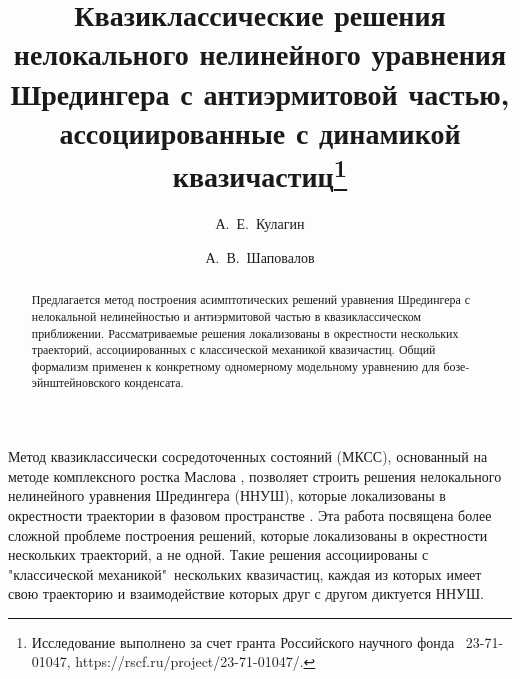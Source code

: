 \usepackage{todonotes}

\usepackage[russian]{nla}


\fi

\title{Квазиклассические решения нелокального нелинейного уравнения Шредингера с антиэрмитовой частью, ассоциированные с динамикой квазичастиц\thanks{Исследование выполнено за счет гранта Российского научного фонда \textnumero~23-71-01047, https://rscf.ru/project/23-71-01047/.}}
\author{А.~Е.~Кулагин  \and  А.~В.~Шаповалов
}


\maketitle

\begin{abstract}
Предлагается метод построения асимптотических решений уравнения Шредингера с нелокальной нелинейностью и антиэрмитовой частью в квазиклассическом приближении. Рассматриваемые решения локализованы в окрестности нескольких траекторий, ассоциированных с классической механикой квазичастиц. Общий формализм применен к конкретному одномерному модельному уравнению для бозе-эйнштейновского конденсата.

\end{abstract}


Метод квазиклассически сосредоточенных состояний (МКСС), основанный на методе комплексного ростка Маслова \cite{mas94}, позволяет строить решения нелокального нелинейного уравнения Шредингера (ННУШ), которые локализованы в окрестности траектории в фазовом пространстве \cite{bel02}. Эта работа посвящена более сложной проблеме построения решений, которые локализованы в окрестности нескольких траекторий, а не одной. Такие решения ассоциированы с "классической механикой"\, нескольких квазичастиц, каждая из которых имеет свою траекторию и взаимодействие которых друг с другом диктуется ННУШ.


